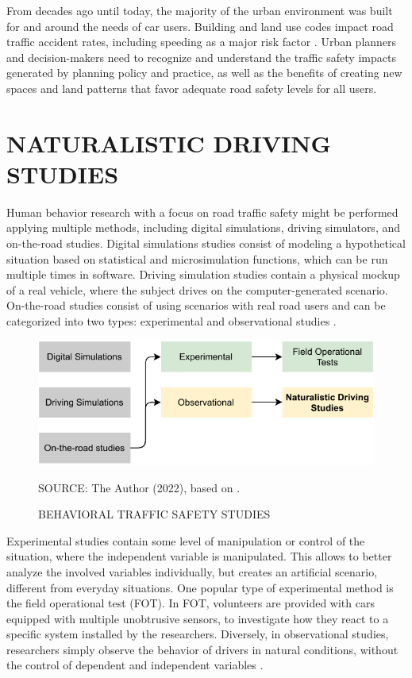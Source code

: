 
From decades ago until today, the majority of the urban environment was built for and around the needs of car users. Building and land use codes impact road traffic accident rates, including speeding as a major risk factor \cite{Knoflacher2016}. Urban planners and decision-makers need to recognize and understand the traffic safety impacts generated by planning policy and practice, as well as the benefits of creating new spaces and land patterns that favor adequate road safety levels for all users. 

\section{NATURALISTIC DRIVING STUDIES} \label{nds}

Human behavior research with a focus on road traffic safety might be performed applying multiple methods, including digital simulations, driving simulators, and on-the-road studies. Digital simulations studies consist of modeling a hypothetical situation based on statistical and microsimulation functions, which can be run multiple times in software. Driving simulation studies contain a physical mockup of a real vehicle, where the subject drives on the computer-generated scenario. On-the-road studies consist of using scenarios with real road users and can be categorized into two types: experimental and observational studies \cite{Shinar2017}. 

\begin{figure}[!htbp]
    \centering\footnotesize
    \captionsetup{font=footnotesize}
    \caption{BEHAVIORAL TRAFFIC SAFETY STUDIES}
    \includegraphics{fig/studies.pdf}
    \label{fig:shinar}
    \par SOURCE: The Author (2022), based on \textcite{Shinar2017}.
\end{figure}

Experimental studies contain some level of manipulation or control of the situation, where the independent variable is manipulated. This allows to better analyze the involved variables individually, but creates an artificial scenario, different from everyday situations. One popular type of experimental method is the field operational test (FOT). In FOT, volunteers are provided with cars equipped with multiple unobtrusive sensors, to investigate how they react to a specific system installed by the researchers. Diversely, in observational studies, researchers simply observe the behavior of drivers in natural conditions, without the control of dependent and independent variables \cite{Shinar2017}. 

